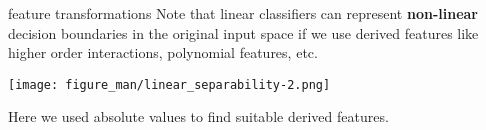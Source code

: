 \documentclass[11pt,compress,t,notes=noshow, xcolor=table]{beamer}
\begin{document}
\begin{vbframe}{feature transformations}
Note that linear classifiers can represent \textbf{non-linear} decision boundaries in the original input space if we use derived features like higher order interactions, polynomial features, etc.

\lz

\begin{center}
\texttt{[image: figure\_man/linear\_separability-2.png]} 
\end{center}

\lz

Here we used absolute values to find suitable derived features.

\end{vbframe}

\endlecture
\end{document}
